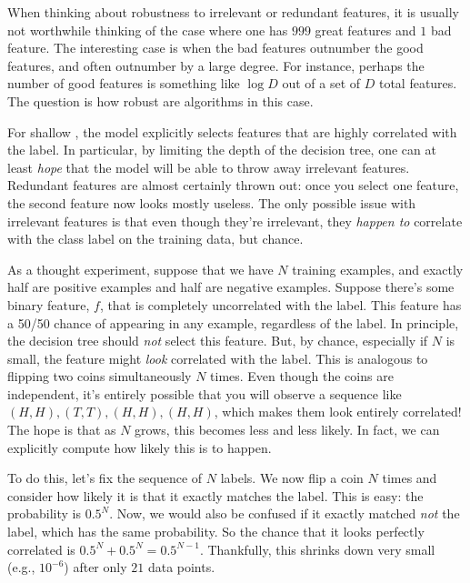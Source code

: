 When thinking about robustness to irrelevant or redundant features, it
is usually not worthwhile thinking of the case where one has $999$
great features and $1$ bad feature.  The interesting case is when the
bad features outnumber the good features, and often outnumber by a
large degree.  For instance, perhaps the number of good features is
something like $\log D$ out of a set of $D$ total features.  The
question is how robust are algorithms in this case.

For shallow , the model explicitly selects
features that are highly correlated with the label.  In particular, by
limiting the depth of the decision tree, one can at least \emph{hope}
that the model will be able to throw away irrelevant features.
Redundant features are almost certainly thrown out: once you select
one feature, the second feature now looks mostly useless.  The only
possible issue with irrelevant features is that even though they're
irrelevant, they \emph{happen to} correlate with the class label on
the training data, but chance.

As a thought experiment, suppose that we have $N$ training examples,
and exactly half are positive examples and half are negative
examples.  Suppose there's some binary feature, $f$, that is completely
uncorrelated with the label.  This feature has a 50/50 chance of
appearing in any example, regardless of the label.  In principle, the
decision tree should \emph{not} select this feature.  But, by chance,
especially if $N$ is small, the feature might \emph{look} correlated
with the label.  This is analogous to flipping two coins
simultaneously $N$ times.  Even though the coins are independent, it's
entirely possible that you will observe a sequence like $(H,H), (T,T),
(H,H), (H,H)$, which makes them look entirely correlated!  The hope is
that as $N$ grows, this becomes less and less likely.  In fact, we can
explicitly compute how likely this is to happen.

To do this, let's fix the sequence of $N$ labels.  We now flip a coin
$N$ times and consider how likely it is that it exactly matches the
label.  This is easy: the probability is $0.5^N$.  Now, we would also
be confused if it exactly matched \emph{not} the label, which has the
same probability.  So the chance that it looks perfectly correlated is
$0.5^N + 0.5^N = 0.5^{N-1}$.  Thankfully, this shrinks down very small
(e.g., $10^{-6}$) after only $21$ data points.

